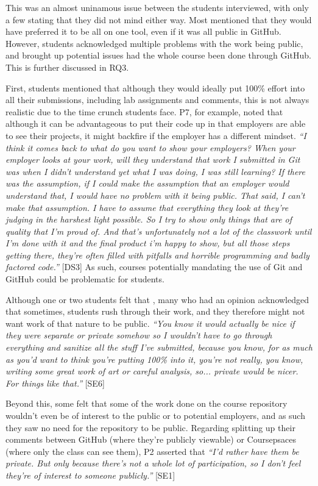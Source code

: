 This was an almost uninamous issue between the students interviewed, with only a few stating that they did not mind either way. Most mentioned that they would have preferred it to be all on one tool, even if it was all public in GitHub. However, students acknowledged multiple problems with the work being public, and brought up potential issues had the whole course been done through GitHub. This is further discussed in RQ3.

First, students mentioned that although they would ideally put 100\% effort into all their submissions, including lab assignments and comments, this is not always realistic due to the time crunch students face. P7, for example, noted that although it can be advantageous to put their code up in that employers are able to see their projects, it might backfire if the employer has a different mindset. \textit{``I think it comes back to what do you want to show your employers? When your employer looks at your work, will they understand that work I submitted in Git was when I didn't understand yet what I was doing, I was still learning? If there was the assumption, if I could make the assumption that an employer would understand that, I would have no problem with it being public. That said, I can't make that assumption. I have to assume that everything they look at they're judging in the harshest light possible. So I try to show only things that are of quality that I'm proud of. And that's unfortunately not a lot of the classwork until I'm done with it and the final product i'm happy to show, but all those steps getting there, they're often filled with pitfalls and horrible programming and badly factored code.''} [DS3] As such, courses potentially mandating the use of Git and GitHub could be problematic for students.

Although one or two students felt that %
, many who had an opinion acknowledged that sometimes, students rush through their work, and they therefore might not want work of that nature to be public. \textit{``You know it would actually be nice if they were separate or private somehow so I wouldn't have to go through everything and sanitize all the stuff I've submitted, because you know, for as much as you'd want to think you're putting 100\% into it, you're not really, you know, writing some great work of art or careful analysis, so... private would be nicer. For things like that.''} [SE6]

Beyond this, some felt that some of the work done on the course repository wouldn't even be of interest to the public or to potential employers, and as such they saw no need for the repository to be public. Regarding splitting up their comments between GitHub (where they're publicly viewable) or Coursepsaces (where only the class can see them), P2 asserted that \textit{``I'd rather have them be private. But only because there's not a whole lot of participation, so I don't feel they're of interest to someone publicly.''} [SE1]

